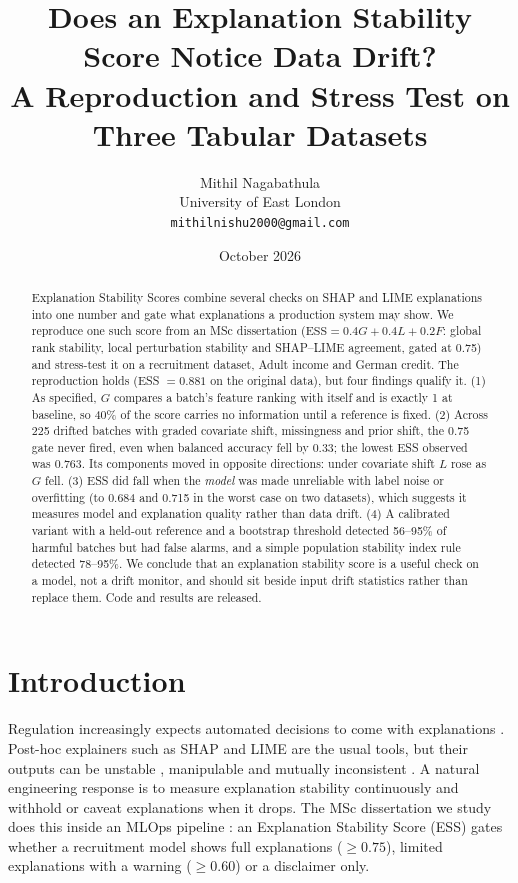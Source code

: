 \documentclass[11pt]{article}
\title{Does an Explanation Stability Score Notice Data Drift?\\
\large A Reproduction and Stress Test on Three Tabular Datasets}
\author{Mithil Nagabathula\\University of East London\\\texttt{mithilnishu2000@gmail.com}}
\date{October 2026}
\begin{document}
\maketitle

\begin{abstract}
Explanation Stability Scores combine several checks on SHAP and LIME explanations into one number and gate what explanations a
production system may show. We reproduce one such score from an MSc dissertation \cite{nagabathula2026ess}
(\(\text{ESS}=0.4G+0.4L+0.2F\): global rank stability, local perturbation stability and SHAP--LIME agreement, gated at 0.75)
and stress-test it on a recruitment dataset, Adult income and German credit.
The reproduction holds (ESS \(=0.881\) on the original data), but four findings qualify it.
(1) As specified, \(G\) compares a batch's feature ranking with itself and is exactly 1 at baseline, so 40\% of the score carries no
information until a reference is fixed.
(2) Across 225 drifted batches with graded covariate shift, missingness and prior shift, the 0.75 gate never fired, even when balanced
accuracy fell by 0.33; the lowest ESS observed was 0.763. Its components moved in opposite directions: under covariate shift \(L\) rose as
\(G\) fell.
(3) ESS did fall when the \emph{model} was made unreliable with label noise or overfitting (to 0.684 and 0.715 in the worst case on two
datasets), which suggests it measures model and explanation quality rather than data drift.
(4) A calibrated variant with a held-out reference and a bootstrap threshold detected 56--95\% of harmful batches but had false alarms,
and a simple population stability index rule detected 78--95\%.
We conclude that an explanation stability score is a useful check on a model, not a drift monitor, and should sit beside input drift
statistics rather than replace them. Code and results are released.
\end{abstract}

\section{Introduction}
Regulation increasingly expects automated decisions to come with explanations \cite{euaiact2024}. Post-hoc explainers such as SHAP
\cite{lundberg2017unified,lundberg2020trees} and LIME \cite{ribeiro2016lime} are the usual tools, but their outputs can be unstable
\cite{alvarezmelis2018robustness,ghorbani2019fragile,yeh2019infidelity}, manipulable \cite{slack2020fooling} and mutually inconsistent
\cite{krishna2022disagreement}. A natural engineering response is to measure explanation stability continuously and withhold or
caveat explanations when it drops. The MSc dissertation we study \cite{nagabathula2026ess} does this inside an MLOps pipeline
\cite{kreuzberger2023mlops,sculley2015debt}: an Explanation Stability Score (ESS) gates whether a recruitment model shows full
explanations (\(\geq 0.75\)), limited explanations with a warning (\(\geq 0.60\)) or a disclaimer only.
\end{document}
